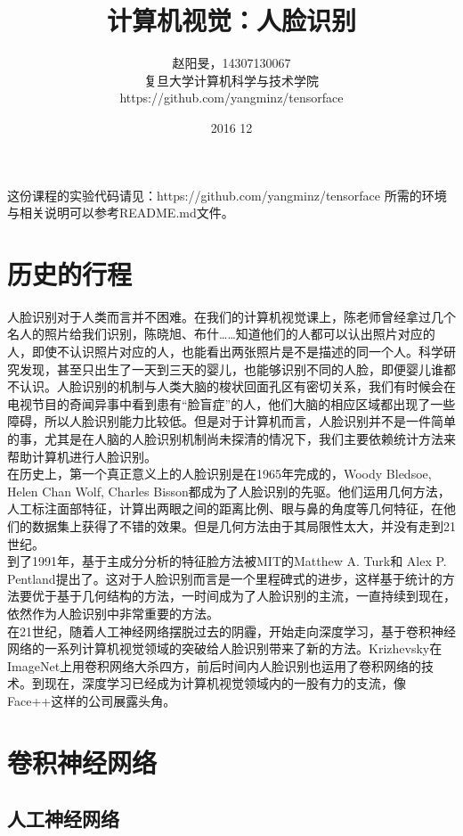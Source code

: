 \documentclass{article}
\title{计算机视觉：人脸识别}
\author{赵阳旻，14307130067\\复旦大学计算机科学与技术学院\\https://github.com/yangminz/tensorface}
\date{2016 12}
\begin{document}
\maketitle
\tableofcontents

\bigskip
这份课程的实验代码请见：https://github.com/yangminz/tensorface 所需的环境与相关说明可以参考README.md文件。

\section{历史的行程}

人脸识别对于人类而言并不困难。在我们的计算机视觉课上，陈老师曾经拿过几个名人的照片给我们识别，陈晓旭、布什……知道他们的人都可以认出照片对应的人，即使不认识照片对应的人，也能看出两张照片是不是描述的同一个人。科学研究发现，甚至只出生了一天到三天的婴儿，也能够识别不同的人脸，即便婴儿谁都不认识。人脸识别的机制与人类大脑的梭状回面孔区有密切关系，我们有时候会在电视节目的奇闻异事中看到患有“脸盲症”的人，他们大脑的相应区域都出现了一些障碍，所以人脸识别能力比较低。但是对于计算机而言，人脸识别并不是一件简单的事，尤其是在人脑的人脸识别机制尚未探清的情况下，我们主要依赖统计方法来帮助计算机进行人脸识别。\\

在历史上，第一个真正意义上的人脸识别是在1965年完成的，Woody Bledsoe, Helen Chan Wolf, Charles Bisson都成为了人脸识别的先驱。他们运用几何方法，人工标注面部特征，计算出两眼之间的距离比例、眼与鼻的角度等几何特征，在他们的数据集上获得了不错的效果。但是几何方法由于其局限性太大，并没有走到21世纪。\\

到了1991年，基于主成分分析的特征脸方法被MIT的Matthew A. Turk和 Alex P. Pentland提出了。这对于人脸识别而言是一个里程碑式的进步，这样基于统计的方法要优于基于几何结构的方法，一时间成为了人脸识别的主流，一直持续到现在，依然作为人脸识别中非常重要的方法。\\

在21世纪，随着人工神经网络摆脱过去的阴霾，开始走向深度学习，基于卷积神经网络的一系列计算机视觉领域的突破给人脸识别带来了新的方法。Krizhevsky在ImageNet上用卷积网络大杀四方，前后时间内人脸识别也运用了卷积网络的技术。到现在，深度学习已经成为计算机视觉领域内的一股有力的支流，像Face++这样的公司展露头角。

\section{卷积神经网络}

\subsection{人工神经网络}
\end{document}

